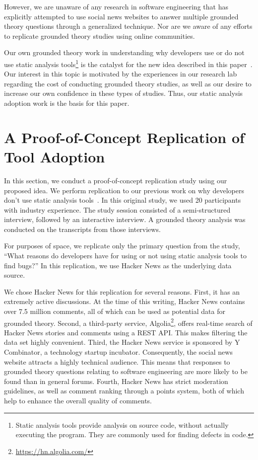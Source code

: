 \documentclass{sig-alternate}
\begin{document}
However, we are unaware of any research in software engineering that has explicitly attempted to use social news websites to answer multiple grounded theory questions through a generalized technique. Nor are we aware of any efforts to replicate grounded theory studies using online communities.

Our own grounded theory work in understanding why developers use or do not use static analysis tools\footnote{Static analysis tools provide analysis on source code, without actually executing the program. They are commonly used for finding defects in code.} is the catalyst for the new idea described in this paper~\cite{Johnson2013a}. Our interest in this topic is motivated by the experiences in our research lab regarding the cost of conducting grounded theory studies, as well as our desire to increase our own confidence in these types of studies. Thus, our static analysis adoption work is the basis for this paper.

\section{A Proof-of-Concept Replication of Tool Adoption}

In this section, we conduct a proof-of-concept replication study using our proposed idea. We perform replication to our previous work on why developers don't use static analysis tools~\cite{Johnson2013a}. In this original study, we used 20 participants with industry experience. The study session consisted of a semi-structured interview, followed by an interactive interview. A grounded theory analysis was conducted on the transcripts from those interviews.

For purposes of space, we replicate only the primary question from the study, ``What reasons do developers have for using or not using static analysis tools to find bugs?'' In this replication, we use Hacker News as the underlying data source.

We chose Hacker News for this replication for several reasons. First, it has an extremely active discussions. At the time of this writing, Hacker News contains over 7.5 million comments, all of which can be used as potential data for grounded theory. Second, a third-party service, Algolia\footnote{\url{https://hn.algolia.com/}}, offers real-time search of Hacker News stories and comments using a REST API. This makes filtering the data set highly convenient. Third, the Hacker News service is sponsored by Y Combinator, a technology startup incubator. Consequently, the social news website attracts a highly technical audience. This means that responses to grounded theory questions relating to software engineering are more likely to be found than in general forums. Fourth, Hacker News has strict moderation guidelines, as well as comment ranking through a points system, both of which help to enhance the overall quality of comments. 
\end{document}
